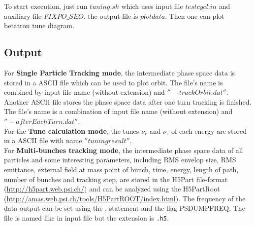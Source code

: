 To start execution, just run $tuning.sh$ which uses input file $testcycl.in$ and auxiliary file $FIXPO\_SEO$.
the output file is $plotdata$. Then one can plot betatron tune diagram.

\subsection{Output}  
For {\bfseries Single Particle Tracking mode}, the intermediate phase space data is stored in a ASCII file which can be used to
plot orbit. The file's name is combined by input file name (without extension) and $''-trackOrbit.dat''$.
Another ASCII file stores the phase space data after one turn tracking is finished. The file's name is a combination of input file name 
(without extension) and $''-afterEachTurn.dat''$.\\
 
For the {\bfseries Tune calculation mode}, the tunes $\nu_r$ and $\nu_z$ of each energy are stored in a ASCII file with name 
$''tuningresult''$.\\

For {\bfseries Multi-bunches tracking mode}, the intermediate phase space data of all particles and some interesting parameters, 
including RMS envelop size, RMS emittance, external field at mass point of bunch, time, energy, length of path, number of bunches and 
tracking step,         
are stored in the H5Part file-format (\url{http://h5part.web.psi.ch/}) and can be analyzed
using the H5PartRoot (\url{http://amas.web.psi.ch/tools/H5PartROOT/index.html}). The frequency 
of the data output can be set using the , statement and the flag PSDUMPFREQ. 
The file is named like in input file but the extension is {\tt .h5}. 

\section{\opalmap} \label{sec:SplitOperatorMethods}

